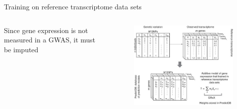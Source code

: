 \documentclass[aspectratio=169,12pt]{beamer}
\begin{document}
\begin{frame}{Training on reference transcriptome data sets}
	
	\begin{columns}
		\begin{column}{0.4\textwidth}
			Since gene expression is not measured in a GWAS, it must be 
imputed
		\end{column}

		\begin{column}{0.6\textwidth}
			\begin{figure}
				\includegraphics[width=\textwidth]{gamazon2015/2-grex_estimation_part1}
			\end{figure}
		\end{column}
	\end{columns}


\end{frame}
\end{document}
